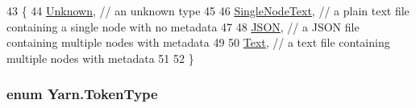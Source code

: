 \begin{DoxyCode}
43     \{
44         \hyperlink{a00045_ad7ebb46e7309ead8767383a672b3272fa88183b946cc5f0e8c96b2e66e1c74a7e}{Unknown}, \textcolor{comment}{// an unknown type}
45 
46         \hyperlink{a00045_ad7ebb46e7309ead8767383a672b3272faceeb33da53902872b63956f8df786cd8}{SingleNodeText}, \textcolor{comment}{// a plain text file containing a single node with no metadata}
47 
48         \hyperlink{a00045_ad7ebb46e7309ead8767383a672b3272fa0ecd11c1d7a287401d148a23bbd7a2f8}{JSON}, \textcolor{comment}{// a JSON file containing multiple nodes with metadata}
49 
50         \hyperlink{a00045_a301aa7c866593a5b625a8fc158bbeacea9dffbf69ffba8bc38bc4e01abf4b1675}{Text}, \textcolor{comment}{//  a text file containing multiple nodes with metadata}
51 
52     \}
\end{DoxyCode}
\hypertarget{a00045_a301aa7c866593a5b625a8fc158bbeace}{
\subsubsection[{Token\-Type}]{\setlength{\rightskip}{0pt plus 5cm}enum {\bf Yarn.\-Token\-Type}\hspace{0.3cm}{\ttfamily [package]}}}\label{a00045_a301aa7c866593a5b625a8fc158bbeace}
